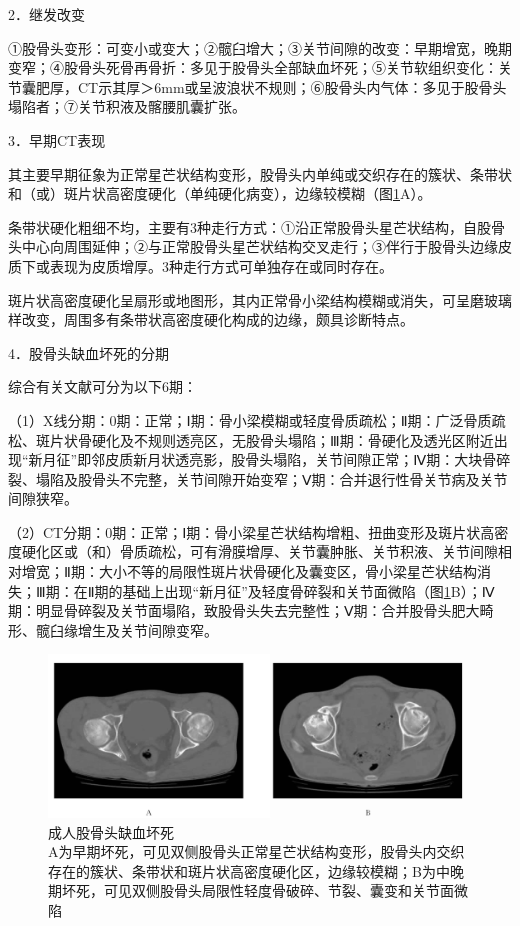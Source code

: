 2．继发改变

①股骨头变形：可变小或变大；②髋臼增大；③关节间隙的改变：早期增宽，晚期变窄；④股骨头死骨再骨折：多见于股骨头全部缺血坏死；⑤关节软组织变化：关节囊肥厚，CT示其厚＞6mm或呈波浪状不规则；⑥股骨头内气体：多见于股骨头塌陷者；⑦关节积液及髂腰肌囊扩张。

3．早期CT表现

其主要早期征象为正常星芒状结构变形，股骨头内单纯或交织存在的簇状、条带状和（或）斑片状高密度硬化（单纯硬化病变），边缘较模糊（图\ref{fig22-36}A）。

条带状硬化粗细不均，主要有3种走行方式：①沿正常股骨头星芒状结构，自股骨头中心向周围延伸；②与正常股骨头星芒状结构交叉走行；③伴行于股骨头边缘皮质下或表现为皮质增厚。3种走行方式可单独存在或同时存在。

斑片状高密度硬化呈扇形或地图形，其内正常骨小梁结构模糊或消失，可呈磨玻璃样改变，周围多有条带状高密度硬化构成的边缘，颇具诊断特点。

4．股骨头缺血坏死的分期

综合有关文献可分为以下6期：

（1）X线分期：0期：正常；Ⅰ期：骨小梁模糊或轻度骨质疏松；Ⅱ期：广泛骨质疏松、斑片状骨硬化及不规则透亮区，无股骨头塌陷；Ⅲ期：骨硬化及透光区附近出现“新月征”即邻皮质新月状透亮影，股骨头塌陷，关节间隙正常；Ⅳ期：大块骨碎裂、塌陷及股骨头不完整，关节间隙开始变窄；Ⅴ期：合并退行性骨关节病及关节间隙狭窄。

（2）CT分期：0期：正常；Ⅰ期：骨小梁星芒状结构增粗、扭曲变形及斑片状高密度硬化区或（和）骨质疏松，可有滑膜增厚、关节囊肿胀、关节积液、关节间隙相对增宽；Ⅱ期：大小不等的局限性斑片状骨硬化及囊变区，骨小梁星芒状结构消失；Ⅲ期：在Ⅱ期的基础上出现“新月征”及轻度骨碎裂和关节面微陷（图\ref{fig22-36}B）；Ⅳ期：明显骨碎裂及关节面塌陷，致股骨头失去完整性；Ⅴ期：合并股骨头肥大畸形、髋臼缘增生及关节间隙变窄。

\begin{figure}[!htbp]
 \centering
 \includegraphics[width=.7\textwidth,height=\textheight,keepaspectratio]{./images/Image00462.jpg}
 \captionsetup{justification=centering}
 \caption{成人股骨头缺血坏死\\{\small A为早期坏死，可见双侧股骨头正常星芒状结构变形，股骨头内交织存在的簇状、条带状和斑片状高密度硬化区，边缘较模糊；B为中晚期坏死，可见双侧股骨头局限性轻度骨破碎、节裂、囊变和关节面微陷}}
 \label{fig22-36}
  \end{figure} 

